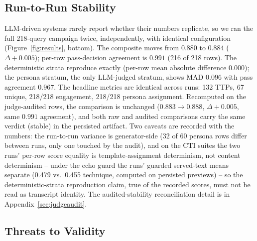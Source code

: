 \subsection{Run-to-Run Stability}
\label{sec:stability}

LLM-driven systems rarely report whether their numbers replicate, so we
ran the full 218-query campaign twice, independently, with identical
configuration (Figure~\ref{fig:results}, bottom). The composite moves
from $0.880$ to $0.884$ ($\Delta +0.005$); per-row pass-decision
agreement is $0.991$ (216 of 218 rows). The deterministic strata
reproduce exactly (per-row mean absolute difference $0.000$); the
persona stratum, the only LLM-judged stratum, shows MAD $0.096$ with
pass agreement $0.967$. The headline metrics are identical across runs:
132 TTPs, 67 unique, 218/218 engagement, 218/218 persona assignment.
Recomputed on the judge-audited rows, the comparison is unchanged
($0.883\to0.888$, $\Delta+0.005$, same $0.991$ agreement), and both raw
and audited comparisons carry the same verdict (stable) in the persisted
artifact. Two caveats are recorded with the numbers: the run-to-run
variance is generator-side (32 of 60 persona rows differ between runs,
only one touched by the audit), and on the CTI suites the two runs'
per-row score equality is template-assignment determinism, not content
determinism -- under the echo guard the runs' guarded served-text means
separate (0.479 vs.\ 0.455 technique, computed on persisted previews) --
so the deterministic-strata reproduction claim, true of the recorded
scores, must not be read as transcript identity. The audited-stability
reconciliation detail is in Appendix~\ref{sec:judgeaudit}.

\subsection{Threats to Validity}
\label{sec:threats}


